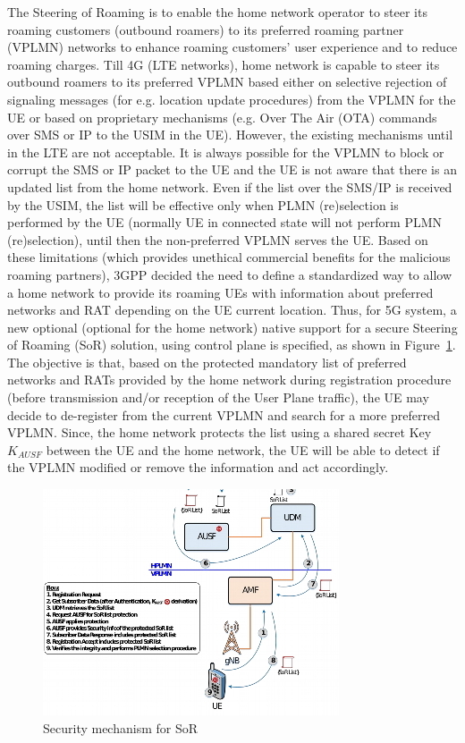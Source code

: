 \begin{multicols}{2}
The Steering of Roaming is to enable the home network operator to steer its roaming customers (outbound roamers) to its preferred roaming partner (VPLMN) networks to enhance roaming customers’ user experience and to reduce roaming charges. Till 4G (LTE networks), home network is capable to steer its outbound roamers to its preferred VPLMN based either on selective rejection of signaling messages (for e.g. location update procedures) from the VPLMN for the UE or based on proprietary mechanisms (e.g. Over The Air (OTA) commands over SMS or IP to the USIM in the UE). However, the existing mechanisms until in the LTE are not acceptable. It is always possible for the VPLMN to block or corrupt the SMS or IP packet to the UE and the UE is not aware that there is an updated list from the home network. Even if the list over the SMS/IP is received by the USIM, the list will be effective only when PLMN (re)selection is performed by the UE (normally UE in connected state will not perform PLMN (re)selection), until then the non-preferred VPLMN serves the UE. Based on these limitations (which provides unethical commercial benefits for the malicious roaming partners), 3GPP decided the need to define a standardized way to allow a home network to provide its roaming UEs with information about preferred networks and RAT depending on the UE current location. Thus, for 5G system, a new optional (optional for the home network) native support for a secure Steering of Roaming (SoR) solution, using control plane is specified, as shown in Figure~\ref{chap4-fig04}. The objective is that, based on the protected mandatory list of preferred networks and RATs provided by the home network during registration procedure (before transmission and/or reception of the User Plane traffic), the UE may decide to de-register from the current VPLMN and search for a more preferred VPLMN. Since, the home network protects the list using a shared secret Key $K_{AUSF}$ between the UE and the home network, the UE will be able to detect if the VPLMN modified or remove the information and act accordingly.
\begin{figure}[H]
\centering
\includegraphics[scale=0.75]{src/Figures/chap4/chap4-fig04.jpg}
\caption{Security mechanism for SoR}\label{chap4-fig04}
\end{figure}


\end{multicols}
